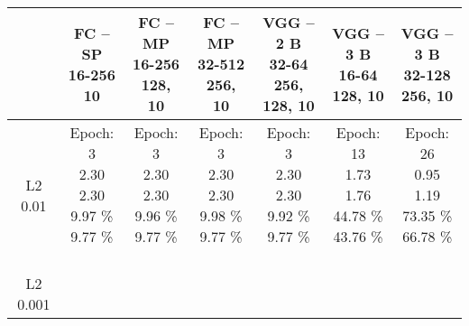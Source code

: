 \begin{center}
\begin{tabular}{ |c|c|c|c|c|c|c| }
\hline
& \thead{FC -- SP\\16-256\\10} & \thead{FC -- MP\\16-256\\128, 10} & \thead{FC -- MP\\32-512\\256, 10} & \thead{VGG -- 2 B\\32-64\\256, 128, 10} & \thead{VGG -- 3 B\\16-64\\128, 10} & \thead{VGG -- 3 B\\32-128\\256, 10} \\
\hline
\thead{\\L2 0.01} & \makecell{
Epoch: 3 \\
2.30 \\
2.30 \\
9.97 \% \\
9.77 \% \\
} & \makecell{
Epoch: 3 \\
2.30 \\
2.30 \\
9.96 \% \\
9.77 \% \\
} & \makecell{
Epoch: 3 \\
2.30 \\
2.30 \\
9.98 \% \\
9.77 \% \\
} & \makecell{
Epoch: 3 \\
2.30 \\
2.30 \\
9.92 \% \\
9.77 \% \\
} & \makecell{
Epoch: 13 \\
1.73 \\
1.76 \\
44.78 \% \\
43.76 \% \\
} & \makecell{
Epoch: 26 \\
0.95 \\
1.19 \\
73.35 \% \\
66.78 \% \\
} \\
\hline
\thead{\\L2 0.001} & \makecell{
}
\end{tabular}
\end{center}
